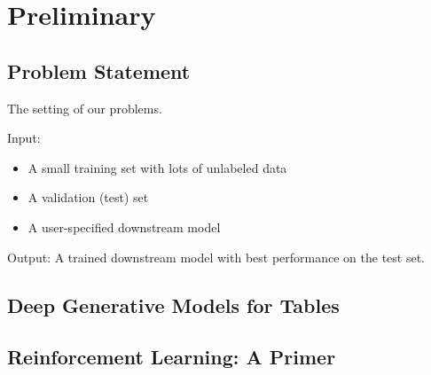 \section{Preliminary} 
\label{sec:pre}

\subsection{Problem Statement}


The setting of our problems.

Input:
\begin{itemize}
	\item A small training set with lots of unlabeled data
	\item A validation (test) set
	\item A user-specified downstream model
\end{itemize}

Output: A trained downstream model with best performance on the test set.


\subsection{Deep Generative Models for Tables}


\subsection{Reinforcement Learning: A Primer}



